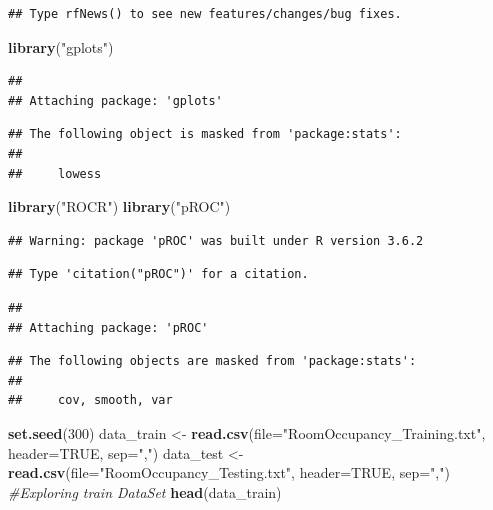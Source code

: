 \documentclass[]{article}
\newenvironment{Shaded}{\begin{snugshade}}{\end{snugshade}}
\newcommand{\CommentTok}[1]{\textcolor[rgb]{0.56,0.35,0.01}{\textit{#1}}}
\newcommand{\DataTypeTok}[1]{\textcolor[rgb]{0.13,0.29,0.53}{#1}}
\newcommand{\DecValTok}[1]{\textcolor[rgb]{0.00,0.00,0.81}{#1}}
\newcommand{\KeywordTok}[1]{\textcolor[rgb]{0.13,0.29,0.53}{\textbf{#1}}}
\newcommand{\NormalTok}[1]{#1}
\newcommand{\OtherTok}[1]{\textcolor[rgb]{0.56,0.35,0.01}{#1}}
\newcommand{\StringTok}[1]{\textcolor[rgb]{0.31,0.60,0.02}{#1}}
\begin{document}
\begin{verbatim}
## Type rfNews() to see new features/changes/bug fixes.
\end{verbatim}

\begin{Shaded}
\begin{Highlighting}[]
\KeywordTok{library}\NormalTok{(}\StringTok{"gplots"}\NormalTok{)}
\end{Highlighting}
\end{Shaded}

\begin{verbatim}
## 
## Attaching package: 'gplots'
\end{verbatim}

\begin{verbatim}
## The following object is masked from 'package:stats':
## 
##     lowess
\end{verbatim}

\begin{Shaded}
\begin{Highlighting}[]
\KeywordTok{library}\NormalTok{(}\StringTok{"ROCR"}\NormalTok{)}
\KeywordTok{library}\NormalTok{(}\StringTok{"pROC"}\NormalTok{)}
\end{Highlighting}
\end{Shaded}

\begin{verbatim}
## Warning: package 'pROC' was built under R version 3.6.2
\end{verbatim}

\begin{verbatim}
## Type 'citation("pROC")' for a citation.
\end{verbatim}

\begin{verbatim}
## 
## Attaching package: 'pROC'
\end{verbatim}

\begin{verbatim}
## The following objects are masked from 'package:stats':
## 
##     cov, smooth, var
\end{verbatim}

\begin{Shaded}
\begin{Highlighting}[]
\KeywordTok{set.seed}\NormalTok{(}\DecValTok{300}\NormalTok{)}
\NormalTok{data_train <-}\StringTok{ }\KeywordTok{read.csv}\NormalTok{(}\DataTypeTok{file=}\StringTok{"RoomOccupancy_Training.txt"}\NormalTok{, }\DataTypeTok{header=}\OtherTok{TRUE}\NormalTok{, }\DataTypeTok{sep=}\StringTok{","}\NormalTok{)}
\NormalTok{data_test <-}\StringTok{ }\KeywordTok{read.csv}\NormalTok{(}\DataTypeTok{file=}\StringTok{"RoomOccupancy_Testing.txt"}\NormalTok{, }\DataTypeTok{header=}\OtherTok{TRUE}\NormalTok{, }\DataTypeTok{sep=}\StringTok{","}\NormalTok{)}
\CommentTok{#Exploring train DataSet}
\KeywordTok{head}\NormalTok{(data_train)}
\end{Highlighting}
\end{Shaded}
\end{document}
